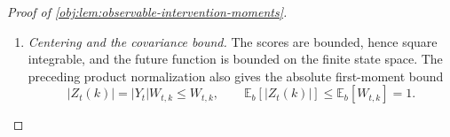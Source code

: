 \documentclass[11pt]{article}
\begin{document}
\begin{proof}[Proof of \cref{obj:lem:observable-intervention-moments}]
\begin{enumerate}
For \(\mu,\mu'\in\Delta(\mathcal S)\), subtracting the midpoint of the range of \(f\) gives
\[
\begin{aligned}
\left|\sum_s(\mu(s)-\mu'(s))f(s)\right|
&=
\left|\sum_s(\mu(s)-\mu'(s))
\left(f(s)-\frac{\max f+\min f}{2}\right)\right|\\
&\le
\frac{\operatorname{osc}(f)}2
\sum_s|\mu(s)-\mu'(s)|\\
&=
\operatorname{osc}(f)\|\mu-\mu'\|_{\mathrm{TV}}.
\end{aligned}
\]
Applying
\cref{obj:ass:target-contraction,obj:ass:behavior-contraction}
to point masses shows that the total variation distance between any two rows of either matrix is at most \(\alpha\). Therefore,
\[
\begin{aligned}
|(P_ef)(s)-(P_ef)(s')|
&\le
\operatorname{osc}(f)
\|P_e(s,\cdot)-P_e(s',\cdot)\|_{\mathrm{TV}}
\le\alpha\operatorname{osc}(f),\\
|(P_bf)(s)-(P_bf)(s')|
&\le
\operatorname{osc}(f)
\|P_b(s,\cdot)-P_b(s',\cdot)\|_{\mathrm{TV}}
\le\alpha\operatorname{osc}(f).
\end{aligned}
\]
Taking the maximum over the two states and iterating, with the identity operator as the zero-step case, gives
\[
\operatorname{osc}(P_e^kr_e)
\le\alpha^k\operatorname{osc}(r_e)
\le\alpha^k
\le1.
\]
Applying the behavior iteration to this bound yields
\[
\operatorname{osc}(f_{\mathrm{future}})
=
\operatorname{osc}(P_b^{g_{\mathrm{gap}}}P_e^kr_e)
\le
\alpha^{g_{\mathrm{gap}}}\operatorname{osc}(P_e^kr_e)
\le\alpha^{g_{\mathrm{gap}}}.
\]

\item \emph{Centering and the covariance bound.}
The scores are bounded, hence square integrable, and the future function is bounded on the finite state space. The preceding product normalization also gives the absolute first-moment bound
\[
|Z_t(k)|=|Y_t|W_{t,k}\le W_{t,k},
\qquad
\mathbb E_b[|Z_t(k)|]\le\mathbb E_b[W_{t,k}]=1.
\]


\end{enumerate}
\end{proof}
\end{document}
